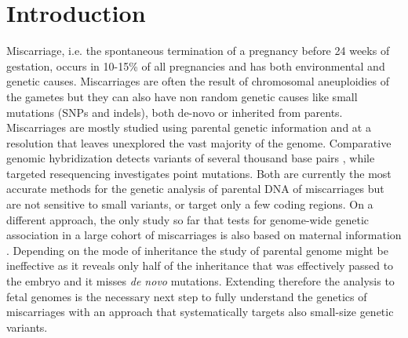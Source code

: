 
\section*{Introduction}

Miscarriage, i.e. the spontaneous termination of a pregnancy before 24 weeks of gestation, occurs in  10-15\% of all pregnancies \cite{larsen2013new,ammon2012systematic, andersen2000maternal} and has both environmental and genetic causes\cite{larsen2013new}. Miscarriages are often the result of chromosomal aneuploidies of the gametes but they can also have non random genetic causes like small mutations (SNPs and indels), both de-novo or inherited from parents. Miscarriages are mostly studied using parental genetic information \cite{pereza2017systematic,quintero2017novel} and at a resolution that leaves unexplored the vast majority of the genome. Comparative genomic hybridization detects variants of several thousand base pairs \cite{robberecht2009diagnosis, kudesia2014rescue,mathur2014miscarriage}, while targeted resequencing investigates point mutations. Both are currently the most accurate methods for the genetic analysis of parental DNA of miscarriages but are not sensitive to small variants, or target only a few coding regions. On a different approach, the only study so far that tests for genome-wide genetic association in a large cohort of miscarriages is also based on maternal information \cite{laisk2020genetic}. Depending on the mode of inheritance the study of parental genome might be ineffective as it reveals only half of the inheritance that was effectively passed to the embryo and it misses \textit{de novo} mutations. Extending therefore the analysis to fetal genomes is the necessary next step to fully understand the genetics of miscarriages with an approach that systematically targets also small-size genetic variants. 

